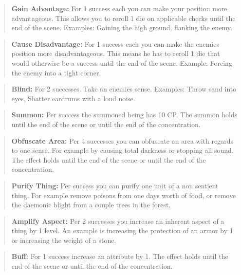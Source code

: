 \documentclass[11pt]{article}
\begin{document}
{\begin{multicols}{2}[]
\begin{quote}
\textbf{Gain Advantage:} For 1 success each you can make your position more advantageous. This allows you to reroll 1 die on applicable checks until the end of the scene. Examples: Gaining the high ground, flanking the enemy.
\end{quote}

\begin{quote}
\textbf{Cause Disadvantage:} For 1 success each you can make the enemies position more disadvantageous. This means he has to reroll 1 die that would otherwise be a success until the end of the scene. Example: Forcing the enemy into a tight corner. 
\end{quote}

\begin{quote}
\textbf{Blind:} For 2 successes. Take an enemies sense. Examples: Throw sand into eyes, Shatter eardrums with a loud noise.
\end{quote}

\begin{quote}
\textbf{Summon:} Per success the summoned being has 10 CP. The summon holds until the end of the scene or until the end of the concentration.
\end{quote}

\begin{quote}
\textbf{Obfuscate Area:} Per 4 successes you can obfuscate an area with regards to one sense. For example by causing total darkness or stopping all sound. The effect holds until the end of the scene or until the end of the concentration.
\end{quote}

\begin{quote}
\textbf{Purify Thing:} Per success you can purify one unit of a non sentient thing. For example remove poisons from one days worth of food, or remove the daemonic blight from a couple trees in the forest.
\end{quote}

\begin{quote}
\textbf{Amplify Aspect:} Per 2 successes you increase an inherent aspect of a thing by 1 level. An example is increasing the protection of an armor by 1 or increasing the weight of a stone.
\end{quote}

\begin{quote}
\textbf{Buff:} For 1 success increase an attribute by 1. The effect holds until the end of the scene or until the end of the concentration.
\end{quote}


\end{multicols}}
\end{document}
